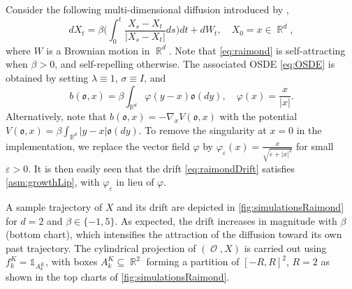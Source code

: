 \documentclass[11pt]{article}
\numberwithin{equation}{section}
\theoremstyle{plain}
\theoremstyle{definition}
\DeclareMathOperator{\R}{\mathbb{R}}
\DeclareMathOperator{\Z}{\mathbb{Z}}
\DeclareMathOperator{\calO}{\mathcal{O}}
\def\mo{\mathfrak{o}}
\begin{document}
Consider the following multi-dimensional %
diffusion introduced by \citet{Raimond}, 
\begin{equation}\label{eq:raimond}
    dX_t = \beta\bigg(\int_0^t \frac{X_s - X_t}{|X_s - X_t|}ds\bigg) dt + dW_t, \quad X_0 =x \in \R^d, 
\end{equation}
where $W$ is a Brownian motion in $\R^d$. Note that \eqref{eq:raimond} is self-attracting when $ \beta > 0$, and self-repelling otherwise. 
The associated  OSDE \eqref{eq:OSDE} is obtained by setting $\lambda \equiv 1$,  $\sigma \equiv I$, and 
\begin{equation}\label{eq:raimondDrift}
    b(\mo,x) = \beta \int_{\R^d} \varphi(y - x)\mo(dy),  \quad \varphi(x) = \frac{x}{|x|}.
\end{equation} 
Alternatively, note that %
$b(\mo,x) = - \nabla_x V(\mo,x)$
with the  potential $V(\mo,x) = \beta \int_{\R^d} |y-x| \mo(dy)$.  To remove  the singularity at $x = 0$ in the implementation, we replace the vector field $\varphi$  by $\varphi_{\varepsilon}(x) = \frac{x}{\sqrt{\varepsilon + |x|^2}}$ for small $\varepsilon>0$. It is then easily seen that %
the drift \eqref{eq:raimondDrift} satisfies  \cref{asm:growthLip}, with $\varphi_{\varepsilon}$ in lieu of $\varphi$. 

A sample trajectory of $X$ and its drift  are  depicted in \cref{fig:simulationsRaimond} for $d=2$ and  $\beta \in \{-1,5\}$. As expected, the drift increases in magnitude with $\beta$ (bottom chart), which intensifies the attraction of  the diffusion toward its own past trajectory. The cylindrical projection of $(\calO,X)$  is carried out using $f_k^K = \mathds{1}_{A_k^K}$, with boxes $A_k^K \subseteq \R^{2}$  forming a partition of $ [-R,R]^2$, $R = 2$ as shown in the top charts of \cref{fig:simulationsRaimond}. 
\end{document}
